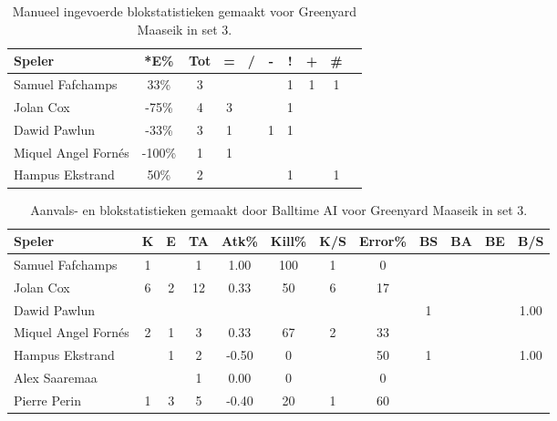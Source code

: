 \begin{table}[ht!]
    \centering
    \scriptsize
    \begin{tabular}{|l|c|c|c|c|c|c|c|c|c|} \hline
        \textbf{Speler} & *E\% & Tot & = & / & - & ! & + & \#\\ \hline
        Samuel Fafchamps & 33\% & 3 &  &  &  & 1 & 1 & 1 \\ 
        Jolan Cox & -75\% & 4 & 3 &  &  & 1 &  & \\ 
        Dawid Pawlun & -33\% & 3 & 1 &  & 1 & 1 &  &  \\ 
        Miquel Angel Fornés & -100\% & 1 & 1 &  &  &  &  & \\ 
        Hampus Ekstrand & 50\% & 2 &  &  &  & 1 &  & 1 \\  \hline
    \end{tabular}
    \caption[Manueel ingevoerde blokstatistieken gemaakt Greenyard Maaseik in set 3]{\label{tab:PL3BlockMaaseikMan3}Manueel ingevoerde blokstatistieken gemaakt voor Greenyard Maaseik in set 3.}
\end{table}

\begin{table}[ht!]
  \centering
  \scriptsize
  \begin{tabular}{|l|c|c|c|c|c|c|c|c|c|c|c|} \hline
    \textbf{Speler} & K & E & TA & Atk\% & Kill\% & K/S & Error\% & BS & BA & BE & B/S \\ \hline
    Samuel Fafchamps & 1 &  & 1 & 1.00 & 100 & 1 & 0 &  &   &  &  \\
    Jolan Cox & 6 & 2 & 12 & 0.33 & 50 & 6 & 17 &  &   &   & \\
    Dawid Pawlun &   &   &   &   &   &   &   & 1 & & & 1.00 \\
    Miquel Angel Fornés & 2 & 1 & 3 & 0.33 & 67 & 2 & 33 &  &   &  & \\
    Hampus Ekstrand &  & 1 & 2 & -0.50 & 0 &  & 50 & 1 & & & 1.00 \\
    Alex Saaremaa &  &  & 1 & 0.00 & 0 &  & 0 &  & & & \\
    Pierre Perin & 1 & 3 & 5 & -0.40 & 20 & 1 & 60 & &  & &  \\  \hline
  \end{tabular}
  \caption[Aanvals- en blokstatistieken gemaakt door Balltime AI voor Greenyard Maaseik in set 3]{\label{tab:PL3AttBlockMaaseikAI3}Aanvals- en blokstatistieken gemaakt door Balltime AI voor Greenyard Maaseik in set 3.}
\end{table}
